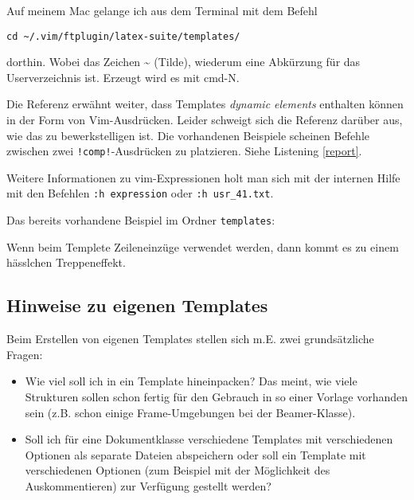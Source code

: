 \documentclass[a4paper,parskip=half,draft=true,DIV=15]{scrartcl}
\begin{document}
Auf meinem Mac gelange ich aus dem Terminal mit dem Befehl

\texttt{cd \textasciitilde/.vim/ftplugin/latex-suite/templates/}

dorthin. Wobei das Zeichen \textasciitilde{} (Tilde), wiederum eine Abkürzung für das Userverzeichnis ist.
Erzeugt wird es mit cmd-N.

Die Referenz erwähnt weiter, dass Templates \emph{dynamic elements} enthalten können in der Form von Vim-Ausdrücken.
Leider schweigt sich die Referenz darüber aus, wie das zu bewerkstelligen ist.
Die vorhandenen Beispiele scheinen Befehle zwischen zwei \texttt{!comp!}-Ausdrücken zu platzieren.
Siehe Listening \ref{report}.

Weitere Informationen zu vim-Expressionen holt man sich mit der internen Hilfe mit den Befehlen
\texttt{:h expression} oder
\texttt{:h usr\_41.txt}.

Das bereits vorhandene Beispiel im Ordner \texttt{templates}:

\lstset{%
	showtabs=false,
      	numbers=left,
	numberstyle=\tiny,
	breaklines=true,
      	breakautoindent=true,
      	basicstyle=\small,
	language=[LaTeX]TeX,
      	keywordstyle=\bfseries,
      	stringstyle=\ttfamily}



Wenn beim Templete Zeileneinzüge verwendet werden, dann kommt es zu einem hässlchen Treppeneffekt.

\subsection{Hinweise zu eigenen Templates}

Beim Erstellen von eigenen Templates stellen sich m.E. zwei grundsätzliche Fragen:
\begin{itemize}
  \item Wie viel soll ich in ein Template hineinpacken? Das meint, wie viele Strukturen sollen schon fertig für den
    Gebrauch in so einer Vorlage vorhanden sein (z.B. schon einige Frame-Umgebungen bei der Beamer-Klasse).
  \item Soll ich für eine Dokumentklasse verschiedene Templates mit verschiedenen Optionen als separate Dateien
    abspeichern oder soll ein Template mit verschiedenen Optionen (zum Beispiel mit der Möglichkeit des Auskommentieren)
    zur Verfügung gestellt werden?
\end{itemize}
\end{document}
